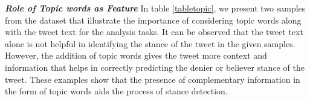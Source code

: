 \documentclass[letterpaper]{article} %
\begin{document}
\begin{table}
\centering
{}
\caption{Examples with stance, tweet text and topic words}
\label{tabletopic}
\end{table}
\par \noindent \textit{\textbf{{Role of Topic words as Feature}}} In table \ref{tabletopic}, we present two samples from the dataset that illustrate the importance of considering topic words along with the tweet text for the analysis tasks. It can be observed that the tweet text alone is not helpful in identifying the stance of the tweet in the given samples. However, the addition of topic words gives the tweet more context and information that helps in correctly predicting the denier or believer stance of the tweet. These examples show that the presence of complementary information in the form of topic words aids the process of stance detection.

\end{document}
